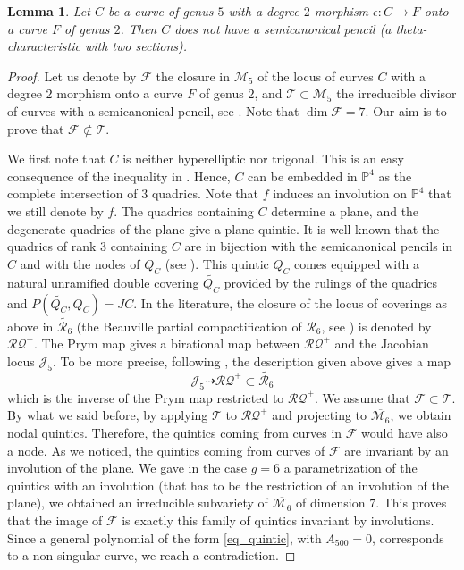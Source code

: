 \documentclass[preprint,12pt]{amsart}
\def\cF{\ensuremath{\mathcal{F}}}
\def\cJ{\ensuremath{\mathcal{J}}}
\def\cM{\ensuremath{\mathcal{M}}}
\def\cR{\ensuremath{\mathcal{R}}}
\def\cT{\ensuremath{\mathcal{T}}}
\theoremstyle{plain}
\newtheorem{lemma}[lemma]{Lemma}
\theoremstyle{definition}
\begin{document}
\begin{lemma}
Let $C$ be a curve of genus $5$ with a degree $2$ morphism $\epsilon : C\rightarrow F$ onto a curve $F$ of genus $2$. Then $C$ does not have a semicanonical pencil (a theta-characteristic with two sections).
\end{lemma}
\begin{proof}
Let us denote by $\cF$ the closure in $\cM_5$ of the locus of curves $C$ with a degree $2$ morphism onto a curve $F$ of genus $2$, and $\cT\subset \cM_5$ the irreducible divisor of curves with a semicanonical pencil, see \cite{Te}. Note that $\dim \cF=7$. Our aim is to prove that $\cF \not\subset  \cT$.

We first note that $C$ is neither hyperelliptic nor trigonal. This is an easy consequence of the inequality in \cite[Lemma 3.1]{N}.
Hence, $C$ can be embedded in $\mathbb P^4$ as the complete intersection of $3$ quadrics.
Note that $f$ induces an involution on $\mathbb P^4$ that we still denote by $f$.
The quadrics containing $C$ determine a plane, and the degenerate quadrics of the plane give a plane quintic. It is well-known that the quadrics of rank $3$ containing $C$ are in bijection with the semicanonical pencils in $C$ and with the nodes of $Q_C$ (see \cite[Cap VI, Exer. F]{ACGH}). This quintic $Q_C$ comes equipped with a natural unramified double covering $\widetilde {Q_C}$ provided by the rulings of the quadrics and $P(\widetilde {Q_C},Q_C)=JC$.
In the literature, the closure of the locus of coverings as above in $\widetilde {\cR_6}$ (the Beauville partial compactification of $\cR_6$, see \cite{be}) is denoted by $\mathcal{RQ}^+$. The Prym map gives a birational map between $\mathcal{RQ}^+$ and the Jacobian locus $\cJ_5$. To be more precise, following \cite[Subsection~(4.3)]{do_fibres}, the description given above gives a map
\[
\cJ_5 \dashrightarrow \mathcal{RQ}^+\subset \widetilde {\cR_6} 
\]
which is the inverse of the Prym map restricted to $\mathcal{RQ}^+$. We assume that $\cF\subset \cT$. By what we said before, by applying $\cT$ to $\mathcal{RQ}^+$ and projecting to $\overline {\cM_6}$, we obtain nodal quintics.
Therefore, the quintics coming from curves in $\cF$ would have also a node.
As we noticed, the quintics coming from curves of $\cF$ are invariant by an involution of the plane.
We gave in the case $g=6$ a parametrization of the quintics with an involution (that has to be the restriction of an involution of the plane), we obtained an irreducible subvariety of $\overline{\cM_6}$ of dimension $7$.
This proves that the image of $\cF$ is exactly this family of quintics invariant by involutions.
Since a general polynomial of the form  \eqref{eq_quintic}, with $A_{500}=0$, corresponds to a non-singular curve, we reach a contradiction.  
\end{proof}
\end{document}
